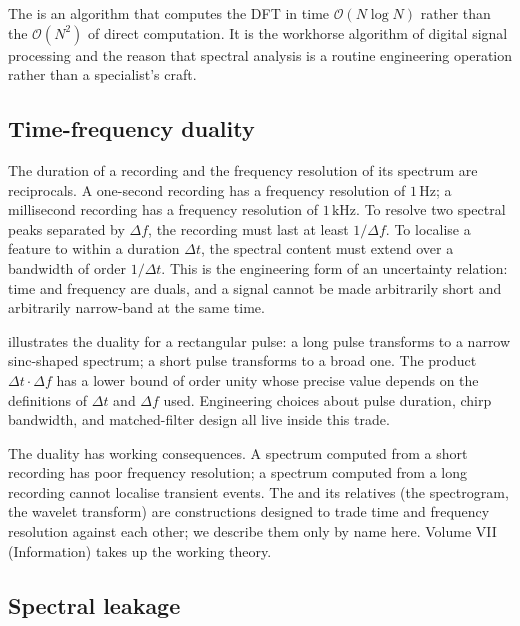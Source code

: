 The  is an algorithm that
computes the DFT in time $\mathcal{O}(N \log N)$ rather than the
$\mathcal{O}(N^{2})$ of direct computation. It is the workhorse
algorithm of digital signal processing and the reason that
spectral analysis is a routine engineering operation rather than a
specialist's craft.

\subsection{Time-frequency duality}

The duration of a recording and the frequency resolution of its
spectrum are reciprocals. A one-second recording has a frequency
resolution of $1 \,\si{\hertz}$; a millisecond recording has a
frequency resolution of $1 \,\si{\kilo\hertz}$. To resolve two
spectral peaks separated by $\Delta f$, the recording must last at
least $1/\Delta f$. To localise a feature to within a duration
$\Delta t$, the spectral content must extend over a bandwidth of
order $1/\Delta t$. This is the engineering form of an uncertainty
relation: time and frequency are duals, and a signal cannot be made
arbitrarily short and arbitrarily narrow-band at the same time.



 illustrates the
duality for a rectangular pulse: a long pulse transforms to a
narrow sinc-shaped spectrum; a short pulse transforms to a broad
one. The product $\Delta t \cdot \Delta f$ has a lower bound of
order unity whose precise value depends on the definitions of $\Delta t$ and $\Delta f$ used. Engineering choices about pulse duration,
chirp bandwidth, and matched-filter design all live inside this
trade.

The duality has working consequences. A spectrum computed from a
short recording has poor frequency resolution; a spectrum computed
from a long recording cannot localise transient events. The
 and its relatives (the
spectrogram, the wavelet transform) are constructions designed to
trade time and frequency resolution against each other; we
describe them only by name here. Volume VII (Information) takes up
the working theory.

\subsection{Spectral leakage}

